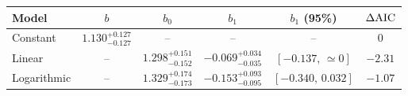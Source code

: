 \begin{tabular}{@{}lccccc@{}}
\toprule
Model & \(b\) & \(b_0\) & \(b_1\) & \(b_1\) (95\%) & \(\Delta{\rm AIC}\)\\
\midrule
Constant & $1.130^{+0.127}_{-0.127}$ & -- & -- & -- & 0 \\
Linear & -- & $1.298^{+0.151}_{-0.152}$ & $-0.069^{+0.034}_{-0.035}$ & $[-0.137,\,\simeq 0]$ & $-2.31$ \\
Logarithmic & -- & $1.329^{+0.174}_{-0.173}$ & $-0.153^{+0.093}_{-0.095}$ & $[-0.340,\,0.032]$ & $-1.07$ \\
\bottomrule
\end{tabular}
